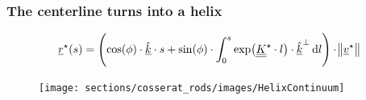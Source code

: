 \begin{frame}
  \frametitle{The centerline turns into a helix}
  \vspace{-1em}
  \begin{displaymath}
    \underline{r}^{\star}(s) = \Biggl( \cos(\phi) \cdot \underline{\hat{k}} \cdot s + \sin(\phi) \cdot \int_0^s \exp \bigl( \doubleunderline{K}^{\star} \cdot l \bigr) \cdot \underline{\hat{k}}^{\perp} \dif l \Biggr) \cdot \norm[1]{\underline{v}^{\star}}
  \end{displaymath}
  \vspace{-0.8em}
  \begin{figure}
    \centering
    \texttt{[image: sections/cosserat\_rods/images/HelixContinuum]}
  \end{figure}
\end{frame}


